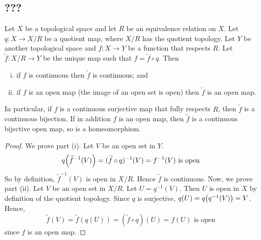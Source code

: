 \subsection{???}
\begin{proposition}
	Let \( X \) be a topological space and let \( R \) be an equivalence relation on \( X \).
	Let \( q \colon X \to X/R \) be a quotient map, where \( X/R \) has the quotient topology.
	Let \( Y \) be another topological space and \( f \colon X \to Y \) be a function that respects \( R \).
	Let \( \widetilde f \colon X/R \to Y \) be the unique map such that \( f = \widetilde f \circ q \).
	Then
	\begin{enumerate}[(i)]
		\item if \( f \) is continuous then \( \widetilde f \) is continuous; and
		\item if \( f \) is an open map (the image of an open set is open) then \( \widetilde f \) is an open map.
	\end{enumerate}
	In particular, if \( f \) is a continuous surjective map that fully respects \( R \), then \( \widetilde f \) is a continuous bijection.
	If in addition \( f \) is an open map, then \( \widetilde f \) is a continuous bijective open map, so is a homeomorphism.
\end{proposition}
\begin{proof}
	We prove part (i).
	Let \( V \) be an open set in \( Y \).
	\[
		q\qty(\widetilde f^{-1}(V)) = (\widetilde f \circ q)^{-1}(V) = f^{-1}(V) \text{ is open}
	\]
	So by definition, \( \widetilde f^{-1}(V) \) is open in \( X/R \).
	Hence \( \widetilde f \) is continuous.
	Now, we prove part (ii).
	Let \( V \) be an open set in \( X/R \).
	Let \( U = q^{-1}(V) \).
	Then \( U \) is open in \( X \) by definition of the quotient topology.
	Since \( q \) is surjective, \( q(U) = q\qty(q^{-1}(V)) = V \).
	Hence,
	\[
		\widetilde f(V) = \widetilde f(q(U)) = (\widetilde f \circ q)(U) = f(U) \text{ is open}
	\]
	since \( f \) is an open map.
\end{proof}

